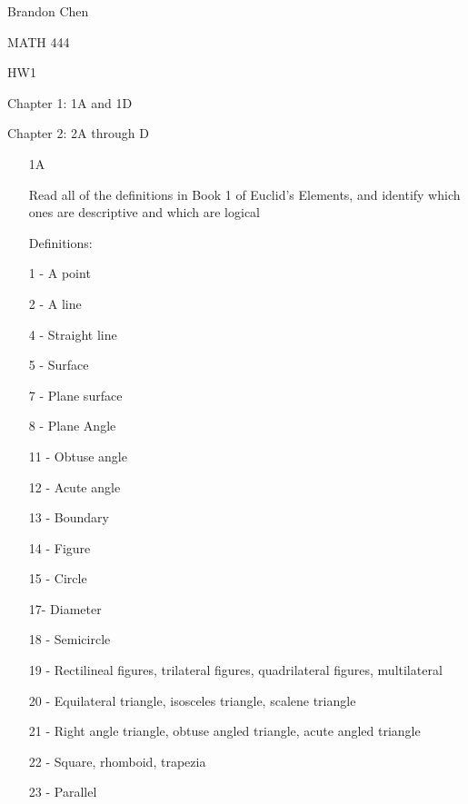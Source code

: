\documentclass[12pt]{article}
\begin{document}
\noindent Brandon Chen

\noindent MATH 444

\noindent HW1

\noindent Chapter 1: 1A and 1D

\noindent Chapter 2: 2A through D

\begin{itemize}

\item[1A]

Read all of the definitions in Book 1 of Euclid's Elements, and identify which ones are descriptive and which are logical

Definitions:

1 - A point

2 - A line

4 - Straight line

5 - Surface

7 - Plane surface

8 - Plane Angle

11 - Obtuse angle

12 - Acute angle

13 - Boundary

14 - Figure

15 - Circle

17- Diameter

18 - Semicircle

19 - Rectilineal figures, trilateral figures, quadrilateral figures, multilateral

20 - Equilateral triangle, isosceles triangle, scalene triangle

21 - Right angle triangle, obtuse angled triangle, acute angled triangle

22 - Square, rhomboid, trapezia

23 - Parallel


\end{itemize}
\end{document}
